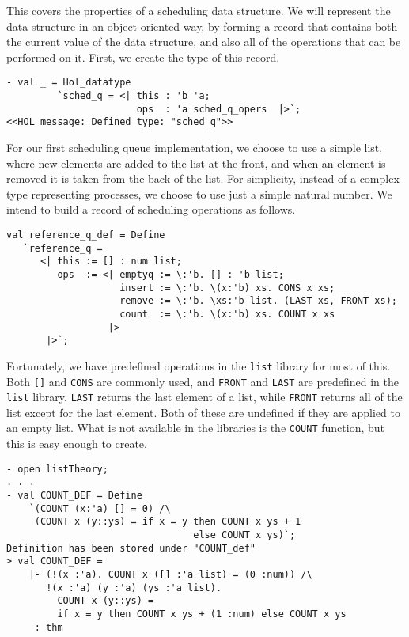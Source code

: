 This covers the properties of a scheduling data structure. We will represent
the data structure in an object-oriented way, by forming a record that contains
both the current value of the data structure, and also all of the operations
that can be performed on it. First, we create the type of this record.
\begin{session}
\begin{verbatim}
- val _ = Hol_datatype
         `sched_q = <| this : 'b 'a;
                       ops  : 'a sched_q_opers  |>`;
<<HOL message: Defined type: "sched_q">>
\end{verbatim}
\end{session}

For our first scheduling queue implementation, we choose to use
a simple list, where new elements are added to the list at the front,
and when an element is removed it is taken from the back of the list.
For simplicity, instead of a complex type representing processes,
we choose to use just a simple natural number.
We intend to build a record of scheduling operations as follows.

\begin{verbatim}
val reference_q_def = Define
   `reference_q =
      <| this := [] : num list;
         ops  := <| emptyq := \:'b. [] : 'b list;
                    insert := \:'b. \(x:'b) xs. CONS x xs;
                    remove := \:'b. \xs:'b list. (LAST xs, FRONT xs);
                    count  := \:'b. \(x:'b) xs. COUNT x xs
                  |>
       |>`;
\end{verbatim}
Fortunately, we have predefined operations in the {\tt list}
library for most of this. Both {\tt []} and {\tt CONS} are commonly used,
and {\tt FRONT} and {\tt LAST} are predefined in the {\tt list} library.
{\tt LAST} returns the last element of a list, while 
{\tt FRONT} returns all of the list except for the last element.
Both of these are undefined if they are applied to an empty list.
%
What is not available in the \HOL{} libraries is the {\tt COUNT} function,
but this is easy enough to create.
\begin{session}
\begin{verbatim}
- open listTheory;
. . .
- val COUNT_DEF = Define
    `(COUNT (x:'a) [] = 0) /\
     (COUNT x (y::ys) = if x = y then COUNT x ys + 1
                                 else COUNT x ys)`;
Definition has been stored under "COUNT_def"
> val COUNT_DEF =
    |- (!(x :'a). COUNT x ([] :'a list) = (0 :num)) /\
       !(x :'a) (y :'a) (ys :'a list).
         COUNT x (y::ys) =
         if x = y then COUNT x ys + (1 :num) else COUNT x ys
     : thm
\end{verbatim}
\end{session}

